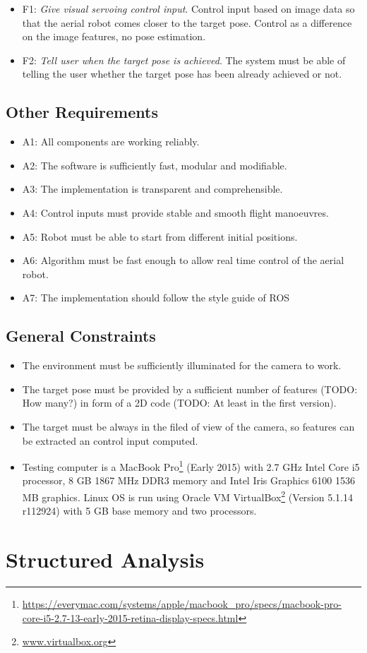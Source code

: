 \begin{itemize}
	\item F1: \emph{Give visual servoing control input}. Control input based on image data so that the aerial robot comes closer to the target pose. Control as a difference on the image features, no pose estimation.
	\item F2: \emph{Tell user when the target pose is achieved}. The system must be able of telling the user whether the target pose has been already achieved or not.
\end{itemize}

\subsection{Other Requirements}
\label{sec:other-requirements}

\begin{itemize}
	\item A1: All components are working reliably.
	\item A2: The software is sufficiently fast, modular and modifiable.
	\item A3: The implementation is transparent and comprehensible.
	\item A4: Control inputs must provide stable and smooth flight manoeuvres.
	\item A5: Robot must be able to start from different initial positions.
	\item A6: Algorithm must be fast enough to allow real time control of the aerial robot.
	\item A7: The implementation should follow the style guide of ROS\cite{ROS_Style}
\end{itemize}

\subsection{General Constraints}
\label{sec:general-constraints}

\begin{itemize}
	\item The environment must be sufficiently illuminated for the camera to work.
	\item The target pose must be provided by a sufficient number of features (TODO: How many?) in form of a 2D code (TODO: At least in the first
version).
	\item The target must be always in the filed of view of the camera, so features can be extracted an control input computed.
	\item Testing computer is a MacBook Pro\footnote{\url{https://everymac.com/systems/apple/macbook_pro/specs/macbook-pro-core-i5-2.7-13-early-2015-retina-display-specs.html}} (Early 2015) with 2.7 GHz Intel Core i5 processor, 8 GB 1867 MHz DDR3 memory and Intel Iris Graphics 6100 1536 MB graphics. Linux OS is run using Oracle VM VirtualBox\footnote{\url{www.virtualbox.org}} (Version 5.1.14 r112924) with 5 GB base memory and two processors.
\end{itemize}


\section{Structured Analysis}
\label{sec:sa}
